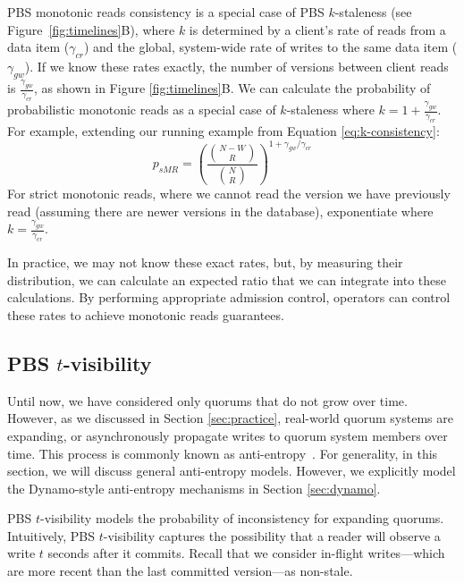 \documentclass{vldb}
\newcommand{\subsectionskip}{-0em}
\begin{document}
PBS monotonic reads consistency is a special case of PBS $k$-staleness (see
Figure~\ref{fig:timelines}B), where $k$ is determined by a client's
rate of reads from a data item ($\gamma_{cr}$) and the global,
system-wide rate of writes to the same data item ($\gamma_{gw}$).  If
we know these rates exactly, the number of versions between client
reads is $\frac{\gamma_{gw}}{\gamma_{cr}}$, as shown in Figure
\ref{fig:timelines}B.  We can calculate the probability of
probabilistic monotonic reads as a special case of $k$-staleness where
$k=1+\frac{\gamma_{gw}}{\gamma_{cr}}$.  For example, extending our running example from Equation \ref{eq:k-consistency}:
\begin{equation}
\label{eq:prob-mr}
p_{sMR} = \left(\frac{{N-W \choose R}}{{N \choose R}}\right)^{1+\gamma_{gw}/\gamma_{cr}}
\end{equation}
For strict monotonic reads, where we cannot read the version we have
previously read (assuming there are newer versions in the database),
exponentiate where $k=\frac{\gamma_{gw}}{\gamma_{cr}}$.

In practice, we may not know these exact rates, but, by measuring
their distribution, we can calculate an expected ratio that we can
integrate into these calculations.  By performing appropriate
admission control, operators can control these rates to achieve
monotonic reads guarantees.

\vspace{\subsectionskip}\subsection{PBS $t$-visibility}
\label{sec:tvis}

Until now, we have considered only quorums that do not grow over time.
However, as we discussed in Section \ref{sec:practice}, real-world quorum
systems are expanding, or asynchronously propagate writes to quorum system
members over time.  This process is commonly known as
anti-entropy~\cite{antientropy}.  For generality, in this section, we
will discuss general anti-entropy models. However, we explicitly model
the Dynamo-style anti-entropy mechanisms in Section \ref{sec:dynamo}.

PBS $t$-visibility models the probability of inconsistency for
expanding quorums.  Intuitively, PBS $t$-visibility captures the
possibility that a reader will observe a write $t$ seconds after it
commits.  Recall that we consider in-flight writes---which are more
recent than the last committed version---as non-stale.
\end{document}

